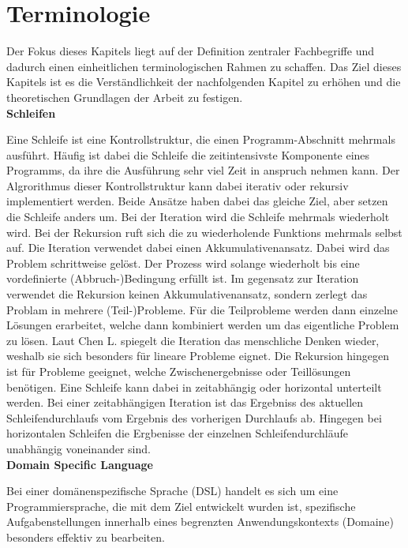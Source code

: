 \documentclass{article}
\begin{document}
    \section{Terminologie}
    Der Fokus dieses Kapitels liegt auf der Definition zentraler Fachbegriffe und dadurch einen einheitlichen terminologischen Rahmen zu schaffen. Das Ziel dieses Kapitels ist es die Verständlichkeit der nachfolgenden Kapitel zu erhöhen und die theoretischen Grundlagen der Arbeit zu festigen.\\
    \textbf{Schleifen} \par
    Eine Schleife ist eine Kontrollstruktur, die einen Programm-Abschnitt mehrmals ausführt. \cite{22}
    Häufig ist dabei die Schleife die zeitintensivste Komponente eines Programms, da ihre die Ausführung sehr viel Zeit in anspruch nehmen kann. \cite{1}
    Der Algrorithmus dieser Kontrollstruktur kann dabei iterativ oder rekursiv implementiert werden. Beide Ansätze haben dabei das gleiche Ziel, aber setzen die Schleife anders um. Bei der Iteration wird die Schleife mehrmals wiederholt wird. Bei der Rekursion ruft sich die zu wiederholende Funktions mehrmals selbst auf. \cite{3}
    Die Iteration verwendet dabei einen Akkumulativenansatz. Dabei wird das Problem schrittweise gelöst. Der Prozess wird solange wiederholt bis eine vordefinierte (Abbruch-)Bedingung erfüllt ist. \cite{3}
    Im gegensatz zur Iteration verwendet die Rekursion keinen Akkumulativenansatz, sondern zerlegt das Problam in mehrere (Teil-)Probleme. Für die Teilprobleme werden dann einzelne Lösungen erarbeitet, welche dann kombiniert werden um das eigentliche Problem zu lösen. \cite{3}
    Laut Chen L. spiegelt die Iteration das menschliche Denken wieder, weshalb sie sich besonders für lineare Probleme eignet. 
    Die Rekursion hingegen ist für Probleme geeignet, welche Zwischenergebnisse oder Teillösungen benötigen. \cite{3}
    Eine Schleife kann dabei in zeitabhängig oder horizontal unterteilt werden. Bei einer zeitabhängigen Iteration ist das Ergebniss des aktuellen Schleifendurchlaufs vom Ergebnis des vorherigen Durchlaufs ab. Hingegen bei horizontalen Schleifen die Ergbenisse der einzelnen Schleifendurchläufe unabhängig voneinander sind. \cite{5} \\
    \textbf{Domain Specific Language} \par
    Bei einer domänenspezifische Sprache (DSL) handelt es sich um eine Programmiersprache, die mit dem Ziel entwickelt wurden ist, spezifische Aufgabenstellungen innerhalb eines begrenzten Anwendungskontexts (Domaine) besonders effektiv zu bearbeiten. \cite{18}
\end{document}
